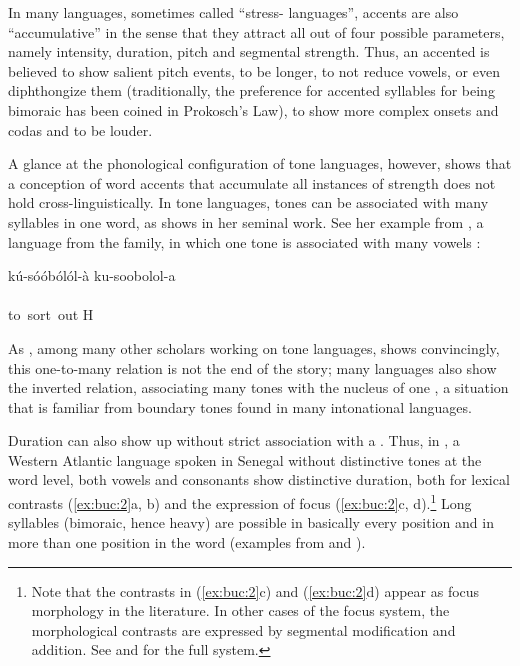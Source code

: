 \documentclass[output=paper]{LSP/langsci}
\begin{document}
In many languages, sometimes called ``stress- languages'', accents are also ``accumulative'' in the sense that they attract all out of four possible  parameters, namely intensity, duration, pitch and segmental strength. Thus, an accented  is believed to show salient pitch events, to be longer, to not reduce vowels, or even diphthongize them (traditionally, the preference for accented syllables for being bimoraic has been coined in Prokosch’s Law), to show more complex onsets and codas and to be louder. 

A glance at the phonological configuration of tone languages, however, shows that a conception of word accents that accumulate all  instances of \linebreak strength does not hold cross-linguistically. In tone languages, tones can be associated with many syllables in one word, as \citet{Yip2002} shows in her seminal work. See her example from , a language from the  family, in which one tone is associated with many vowels \citep[68]{Yip2002}:


\ea
\label{ex:buc:1}  
\glll kú-sóóbólól-à   ku-soobolol-a\\
      ~				~ \\
     to~sort~out     H  \\
     
\z
{}

As \citet{Yip2002}, among many other scholars working on tone languages, shows convincingly, this one-to-many relation is not the end of the story; many languages also show the inverted relation, associating many tones with the nucleus of one , a situation that is familiar from boundary tones found in many intonational languages.

Duration can also show up without strict association with a . Thus, in , a Western Atlantic language spoken in Senegal without distinctive tones at the word level, both vowels and consonants show distinctive duration, both for lexical contrasts (\ref{ex:buc:2}a, b) and the expression of focus (\ref{ex:buc:2}c, d).\footnote{Note that the contrasts in (\ref{ex:buc:2}c) and (\ref{ex:buc:2}d) appear as focus morphology in the literature. In other cases of the focus system, the morphological contrasts are expressed by segmental modification and addition. See \citet{Voisin-Nouguier2002} and \citet{Rialland2001} for the full system.} Long syllables (bimoraic, hence heavy) are possible in basically every position  and in more than one position in the word  (examples from \citealt{Ka1989,Ka1994} and \citealt{Voisin-Nouguier2002}).
\end{document}
